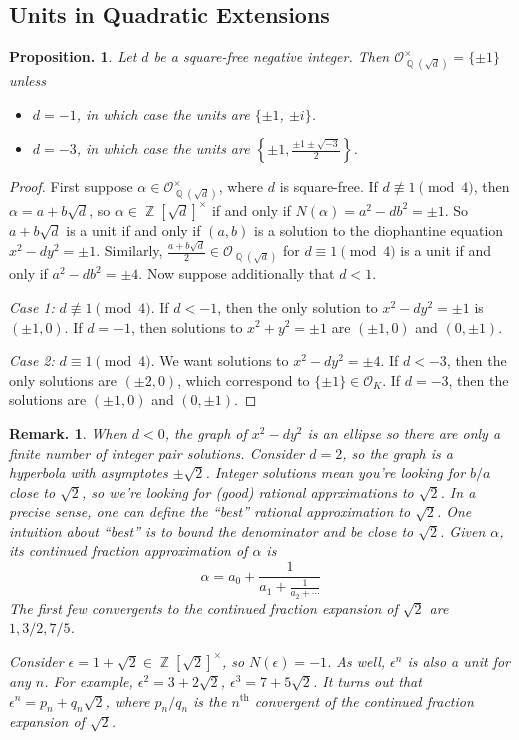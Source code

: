 \documentclass[11pt, a4paper]{memoir}
\DeclareMathOperator{\Q}{{\mathbb{Q}}}
\DeclareMathOperator{\Z}{{\mathbb{Z}}}
\theoremstyle{change}
\newtheorem{proposition}[theorem]{Proposition.}
\theoremstyle{plain}
\theoremstyle{nonumberplain}
\newtheorem{remark}{Remark.}
\newtheorem{proof}{Proof}
\begin{document}
\subsection{Units in Quadratic Extensions}
\begin{proposition}
    Let $d$ be a square-free negative integer.
    Then $\mathcal{O}_{\Q(\sqrt{d})}^\times=\{\pm 1\}$ unless
    \begin{itemize}[nolistsep]
        \item $d=-1$, in which case the units are $\{\pm 1$, $\pm i\}$.
        \item $d=-3$, in which case the units are $\left\{\pm 1,\frac{\pm 1\pm\sqrt{-3}}{2}\right\}$.
    \end{itemize}
\end{proposition}
\begin{proof}
    First suppose $\alpha\in\mathcal{O}_{\Q(\sqrt{d})}^\times$, where $d$ is square-free.
    If $d\nequiv 1\pmod{4}$, then $\alpha=a+b\sqrt{d}$, so $\alpha\in\Z[\sqrt{d}]^\times$ if and only if $N(\alpha)=a^2-db^2=\pm 1$.
    So $a+b\sqrt{d}$ is a unit if and only if $(a,b)$ is a solution to the diophantine equation $x^2-dy^2=\pm1$.
    Similarly, $\frac{a+b\sqrt{d}}{2}\in\mathcal{O}_{\Q(\sqrt{d})}$ for $d\equiv 1\pmod{4}$ is a unit if and only if $a^2-db^2=\pm 4$.
    Now suppose additionally that $d<1$.

    \textit{Case 1:} $d\nequiv 1\pmod{4}$.
    If $d<-1$, then the only solution to $x^2-dy^2=\pm 1$ is $(\pm 1,0)$.
    If $d=-1$, then solutions to $x^2+y^2=\pm 1$ are $(\pm 1,0)$ and $(0,\pm 1)$.

    \textit{Case 2:} $d\equiv 1\pmod{4}$.
    We want solutions to $x^2-dy^2=\pm 4$.
    If $d<-3$, then the only solutions are $(\pm 2,0)$, which correspond to $\{\pm 1\}\in\mathcal{O}_K$.
    If $d=-3$, then the solutions are $(\pm 1,0)$ and $(0,\pm 1)$.
\end{proof}
\begin{remark}
    When $d<0$, the graph of $x^2-dy^2$ is an ellipse so there are only a finite number of integer pair solutions.
    Consider $d=2$, so the graph is a hyperbola with asymptotes $\pm\sqrt{2}$.
    Integer solutions mean you're looking for $b/a$ close to $\sqrt{2}$, so we're looking for (good) rational apprximations to $\sqrt{2}$.
    In a precise sense, one can define the ``best'' rational approximation to $\sqrt{2}$.
    One intuition about ``best'' is to bound the denominator and be close to $\sqrt{2}$.
    Given $\alpha$, its continued fraction approximation of $\alpha$ is
    \begin{equation*}
        \alpha=a_0+\frac{1}{a_1+\frac{1}{a_2+\cdots}}
    \end{equation*}
    The first few convergents to the continued fraction expansion of $\sqrt{2}$ are $1,3/2,7/5$.

    Consider $\epsilon=1+\sqrt{2}\in\Z[\sqrt{2}]^\times$, so $N(\epsilon)=-1$.
    As well, $\epsilon^n$ is also a unit for any $n$.
    For example, $\epsilon^2=3+2\sqrt{2}$, $\epsilon^3=7+5\sqrt{2}$.
    It turns out that $\epsilon^n=p_n+q_n\sqrt{2}$, where $p_n/q_n$ is the $n^\text{th}$ convergent of the continued fraction expansion of $\sqrt{2}$.
\end{remark}
\end{document}
